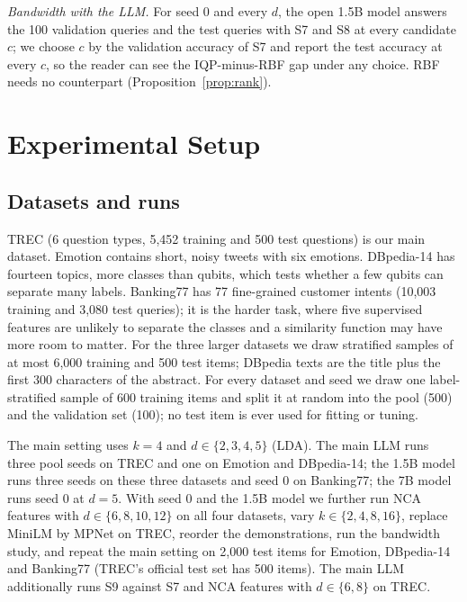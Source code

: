 \emph{Bandwidth with the LLM.}
\label{sec:bw}
For seed 0 and every $d$, the open 1.5B model answers the 100 validation queries and the test queries with
S7 and S8 at every candidate $c$; we choose $c$ by the validation accuracy of S7 and report the test
accuracy at every $c$, so the reader can see the IQP-minus-RBF gap under any choice. RBF needs no counterpart (Proposition~\ref{prop:rank}).

\section{Experimental Setup}

\subsection{Datasets and runs}
TREC \cite{li2002learning} (6 question types, 5{,}452 training and 500 test questions) is our main
dataset. Emotion \cite{saravia2018carer} contains short, noisy tweets with six emotions. DBpedia-14
\cite{zhang2015character} has fourteen topics, more classes than qubits, which tests whether a few
qubits can separate many labels. Banking77 \cite{casanueva2020efficient} has 77 fine-grained customer
intents (10{,}003 training and 3{,}080 test queries); it is the harder task, where five supervised
features are unlikely to separate the classes and a similarity function may have more room to matter. For the three larger
datasets we draw stratified samples of at most 6{,}000 training and 500 test items; DBpedia texts are the
title plus the first 300 characters of the abstract. For every dataset and seed we draw one
label-stratified sample of 600 training items and split it at random into the pool (500) and the
validation set (100); no test item is ever used for fitting or tuning.

The main setting uses $k=4$ and $d\in\{2,3,4,5\}$ (LDA). The main LLM runs three pool seeds on TREC and
one on Emotion and DBpedia-14; the 1.5B model runs three seeds on these three datasets and seed 0 on
Banking77; the 7B model runs seed 0 at $d=5$. With seed 0 and the 1.5B model we further run NCA features
with $d\in\{6,8,10,12\}$ on all four datasets, vary $k\in\{2,4,8,16\}$, replace MiniLM by MPNet on TREC,
reorder the demonstrations, run the bandwidth study, and repeat the main setting on 2{,}000 test items for
Emotion, DBpedia-14 and Banking77 (TREC's official test set has 500 items). The main LLM additionally runs
S9 against S7 and NCA features with $d\in\{6,8\}$ on TREC.

